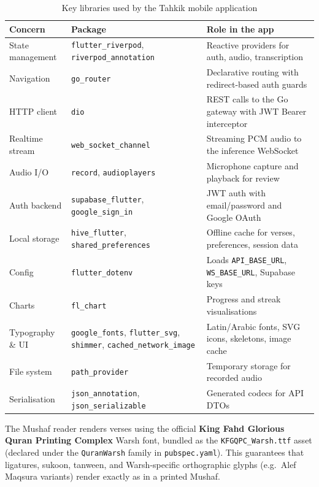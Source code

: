 \begin{table}[H]
  \centering
  \caption{Key libraries used by the Tahkik mobile application}
  \label{tab:impl_app_libs}
  \renewcommand{\arraystretch}{1.3}
  \begin{tabular}{lp{4.2cm}p{6cm}}
    \toprule
    \textbf{Concern} & \textbf{Package} & \textbf{Role in the app} \\
    \midrule
    State management & \texttt{flutter\_riverpod}, \texttt{riverpod\_annotation} & Reactive providers for auth, audio, transcription \\
    Navigation       & \texttt{go\_router}                & Declarative routing with redirect-based auth guards \\
    HTTP client      & \texttt{dio}                       & REST calls to the Go gateway with JWT Bearer interceptor \\
    Realtime stream  & \texttt{web\_socket\_channel}      & Streaming PCM audio to the inference WebSocket \\
    Audio I/O        & \texttt{record}, \texttt{audioplayers} & Microphone capture and playback for review \\
    Auth backend     & \texttt{supabase\_flutter}, \texttt{google\_sign\_in} & JWT auth with email/password and Google OAuth \\
    Local storage    & \texttt{hive\_flutter}, \texttt{shared\_preferences} & Offline cache for verses, preferences, session data \\
    Config           & \texttt{flutter\_dotenv}           & Loads \texttt{API\_BASE\_URL}, \texttt{WS\_BASE\_URL}, Supabase keys \\
    Charts           & \texttt{fl\_chart}                 & Progress and streak visualisations \\
    Typography \& UI & \texttt{google\_fonts}, \texttt{flutter\_svg}, \texttt{shimmer}, \texttt{cached\_network\_image} & Latin/Arabic fonts, SVG icons, skeletons, image cache \\
    File system      & \texttt{path\_provider}            & Temporary storage for recorded audio \\
    Serialisation    & \texttt{json\_annotation}, \texttt{json\_serializable} & Generated codecs for API DTOs \\
    \bottomrule
  \end{tabular}
\end{table}

\begin{infobox}[title=Custom Warsh Font]
The Mushaf reader renders verses using the official \textbf{King Fahd Glorious Quran Printing Complex} Warsh font, bundled as the \texttt{KFGQPC\_Warsh.ttf} asset (declared under the \texttt{QuranWarsh} family in \texttt{pubspec.yaml}). This guarantees that ligatures, sukoon, tanween, and Warsh-specific orthographic glyphs (e.g.\ Alef Maqsura variants) render exactly as in a printed Mushaf.
\end{infobox}

